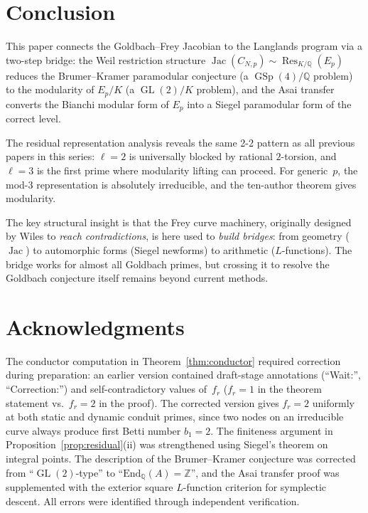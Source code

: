 \documentclass[11pt,a4paper]{article}
\theoremstyle{definition}
\DeclareMathOperator{\GL}{GL}
\DeclareMathOperator{\GSp}{GSp}
\DeclareMathOperator{\Jac}{Jac}
\DeclareMathOperator{\Res}{Res}
\begin{document}
\section{Conclusion}

This paper connects the Goldbach--Frey Jacobian to the Langlands program via a two-step bridge: the Weil restriction structure $\Jac(C_{N,p}) \sim \Res_{K/\mathbb{Q}}(E_p)$ reduces the Brumer--Kramer paramodular conjecture (a $\GSp(4)/\mathbb{Q}$ problem) to the modularity of $E_p/K$ (a $\GL(2)/K$ problem), and the Asai transfer converts the Bianchi modular form of $E_p$ into a Siegel paramodular form of the correct level.

The residual representation analysis reveals the same 2-2 pattern as all previous papers in this series: $\ell = 2$ is universally blocked by rational $2$-torsion, and $\ell = 3$ is the first prime where modularity lifting can proceed. For generic~$p$, the mod-$3$ representation is absolutely irreducible, and the ten-author theorem gives modularity.

The key structural insight is that the Frey curve machinery, originally designed by Wiles to \emph{reach contradictions}, is here used to \emph{build bridges}: from geometry ($\Jac$) to automorphic forms (Siegel newforms) to arithmetic ($L$-functions). The bridge works for almost all Goldbach primes, but crossing it to resolve the Goldbach conjecture itself remains beyond current methods.

\section*{Acknowledgments}

The conductor computation in Theorem~\ref{thm:conductor} required correction during preparation: an earlier version contained draft-stage annotations (``Wait:'', ``Correction:'') and self-contradictory values of~$f_r$ ($f_r = 1$ in the theorem statement vs.\ $f_r = 2$ in the proof). The corrected version gives $f_r = 2$ uniformly at both static and dynamic conduit primes, since two nodes on an irreducible curve always produce first Betti number $b_1 = 2$. The finiteness argument in Proposition~\ref{prop:residual}(ii) was strengthened using Siegel's theorem on integral points. The description of the Brumer--Kramer conjecture was corrected from ``$\GL(2)$-type'' to ``$\mathrm{End}_\mathbb{Q}(A) = \mathbb{Z}$'', and the Asai transfer proof was supplemented with the exterior square $L$-function criterion for symplectic descent. All errors were identified through independent verification.
\end{document}
